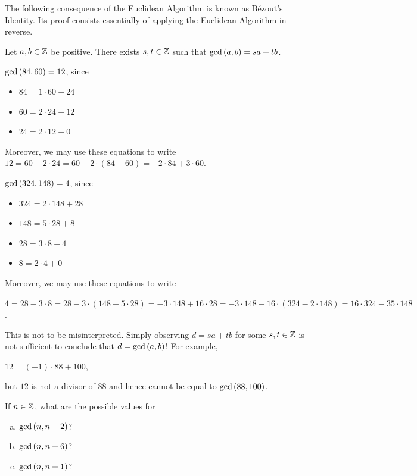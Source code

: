 \documentclass[11pt,fleqn,dvipsnames,usenames]{article}
\newcommand{\p}{\noindent}
\begin{document}
\p The following consequence of the Euclidean Algorithm is known as B\'{e}zout's Identity.  Its proof consists  essentially of applying the Euclidean Algorithm in reverse.
\vsp

\begin{corollary}\label{bezout}
Let $a,b\in\mathbb{Z}$ be positive.  There exists $s,t\in\mathbb{Z}$ such that $\text{gcd}\left(a,b\right) = sa + tb$.
\end{corollary}
%
\begin{example}
$\text{gcd}\left(84,60\right) = 12$, since
\begin{itemize}[\ ]
\item $84 = 1\cdot 60 + 24$
\item $60 = 2\cdot 24 + 12$
\item $24 = 2\cdot 12 + 0$
\end{itemize}

\p Moreover, we may use these equations to write $12 = 60 - 2\cdot 24 = 60 - 2\cdot (84 - 60) = -2\cdot 84 + 3\cdot 60$.
\end{example}

\begin{example}
$\text{gcd}\left(324, 148\right) = 4$, since
\begin{itemize}[\ ]
\item $324 = 2\cdot 148 + 28$
\item $148 = 5\cdot 28 + 8$
\item $28 = 3\cdot 8 + 4$
\item $8 = 2\cdot 4 + 0$
\end{itemize}

\p Moreover, we may use these equations to write
\begin{center}
$4 = 28 - 3\cdot 8 = 28 - 3\cdot (148 - 5\cdot 28) = -3\cdot 148 + 16\cdot 28 = -3\cdot 148 + 16\cdot (324 - 2\cdot 148) = 16\cdot 324 - 35\cdot 148$.
\end{center}
\end{example}
\newpage

\caution This is not to be misinterpreted.  Simply observing $d = sa + tb$ for some $s,t\in\mathbb{Z}$ is not sufficient to conclude that $d = \text{gcd}\left(a, b\right)$!  For example,
\begin{center}
$12 = (-1)\cdot 88 + 100$,
\end{center}
but $12$ is not a divisor of $88$ and hence cannot be equal to $\text{gcd}\left(88,100\right)$.
\vsp

\begin{exercise}
If $n\in\mathbb{Z}$, what are the possible values for
\begin{enumerate}[(a)]
\item $\text{gcd}\left(n, n+2\right)$?
\item $\text{gcd}\left(n, n+6\right)$?
\item $\text{gcd}\left(n, n+1\right)$?
\end{enumerate}
\end{exercise}
\end{document}

